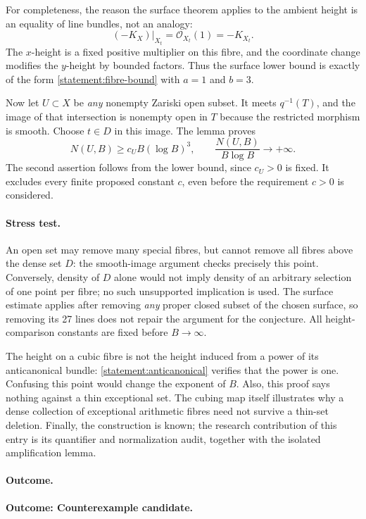 \documentclass[11pt,a4paper]{article}
\numberwithin{equation}{section}
\begin{document}
For completeness, the reason the surface theorem applies to the ambient
height is an equality of line bundles, not an analogy:
\[
 (-K_X)|_{X_t}=\mathcal O_{X_t}(1)=-K_{X_t}.
\]
The $x$-height is a fixed positive multiplier on this fibre, and the
coordinate change modifies the $y$-height by bounded factors. Thus the
surface lower bound is exactly of the form \eqref{statement:fibre-bound} with
$a=1$ and $b=3$.

Now let $U\subset X$ be \emph{any} nonempty Zariski open subset. It meets
$q^{-1}(T)$, and the image of that intersection is nonempty open in $T$
because the restricted morphism is smooth. Choose $t\in D$ in this
image. The lemma proves
\begin{equation}\label{statement:contradiction}
 N(U,B)\ge c_U B(\log B)^3,
 \qquad
 \frac{N(U,B)}{B\log B}\longrightarrow+\infty.
\end{equation}
The second assertion follows from the lower bound, since $c_U>0$ is fixed.
It excludes every finite proposed constant $c$, even before the requirement
$c>0$ is considered.

\paragraph{Stress test.}
An open set may remove many special fibres, but cannot remove all fibres
above the dense set $D$: the smooth-image argument checks precisely this
point. Conversely, density of $D$ alone would not imply density of an
arbitrary selection of one point per fibre; no such unsupported implication
is used. The surface estimate applies after removing \emph{any} proper
closed subset of the chosen surface, so removing its 27 lines does not
repair the argument for the conjecture. All height-comparison constants
are fixed before $B\to\infty$.

The height on a cubic fibre is not the height induced from a power of its
anticanonical bundle: \eqref{statement:anticanonical} verifies that the power is
one. Confusing this point would change the exponent of $B$. Also, this
proof says nothing against a thin exceptional set. The cubing map itself
illustrates why a dense collection of exceptional arithmetic fibres need
not survive a thin-set deletion. Finally, the construction is known; the
research contribution of this entry is its quantifier and normalization
audit, together with the isolated amplification lemma.

\paragraph{Outcome.}
\textbf{Outcome: Counterexample candidate.}
\end{document}
